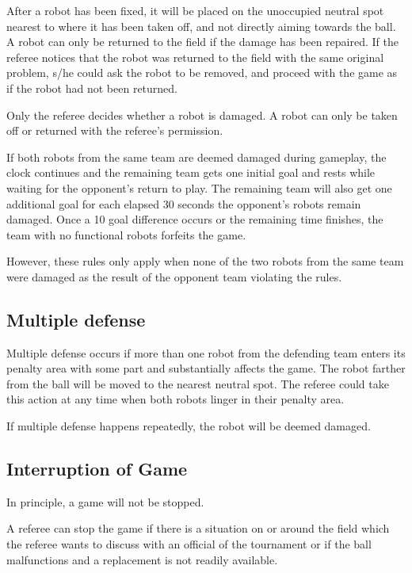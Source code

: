 \documentclass{article}
\begin{document}
After a robot has been fixed, it will be placed on the unoccupied neutral spot
nearest to where it has been taken off, and not directly aiming towards the
ball. A robot can only be returned to the field if the damage has been
repaired. If the referee notices that the robot was returned to the field with
the same original problem, s/he could ask the robot to be removed, and proceed
with the game as if the robot had not been returned.

Only the referee decides whether a robot is damaged. A robot can only be taken
off or returned with the referee's permission.

{
If both robots from the same team are deemed damaged during gameplay, the clock
continues and the remaining team gets one initial goal and rests while waiting
for the opponent's return to play. The remaining team will also get one
additional goal for each elapsed 30 seconds the opponent's robots remain
damaged. Once a 10 goal difference occurs or the remaining time finishes, the
team with no functional robots forfeits the game.
}

However, these rules only apply when none of the two robots from the same team
were damaged as the result of the opponent team violating the rules.

\subsection{Multiple defense \label{ref-013}}

Multiple defense occurs if more than one robot from the defending team enters
its penalty area with some part and substantially affects the game. The robot
farther from the ball will be moved to the nearest neutral spot. The referee
could take this action at any time when both robots linger in their penalty
area.

If multiple defense happens repeatedly, the robot will be deemed damaged.

\subsection{Interruption of Game \label{ref-014}}

In principle, a game will not be stopped.

A referee can stop the game if there is a situation on or around the field
which the referee wants to discuss with an official of the tournament or if the
ball malfunctions and a replacement is not readily available.
\end{document}
